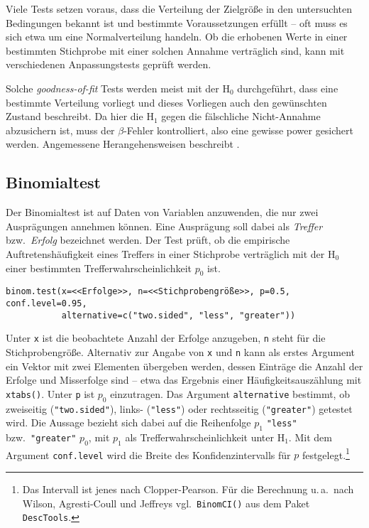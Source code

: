 Viele Tests setzen voraus, dass die Verteilung der Zielgröße in den untersuchten Bedingungen bekannt ist und bestimmte Voraussetzungen erfüllt -- oft muss es sich etwa um eine Normalverteilung handeln. Ob die erhobenen Werte in einer bestimmten Stichprobe mit einer solchen Annahme verträglich sind, kann mit verschiedenen Anpassungstests geprüft werden.

Solche \emph{goodness-of-fit} Tests werden meist mit der $\text{H}_{0}$ durchgeführt, dass eine bestimmte Verteilung vorliegt und dieses Vorliegen auch den gewünschten Zustand beschreibt. Da hier die $\text{H}_{1}$ gegen die fälschliche Nicht-Annahme abzusichern ist, muss der $\beta$-Fehler kontrolliert, also eine gewisse power gesichert werden. Angemessene Herangehensweisen beschreibt .

\subsection{Binomialtest}
\label{sec:binomTest}

Der Binomialtest ist auf Daten von Variablen anzuwenden, die nur zwei Ausprägungen annehmen können. Eine Ausprägung soll dabei als \emph{Treffer} bzw.\ \emph{Erfolg} bezeichnet werden. Der Test prüft, ob die empirische Auftretenshäufigkeit eines Treffers in einer Stichprobe verträglich mit der $\text{H}_{0}$ einer bestimmten Trefferwahrscheinlichkeit $p_{0}$ ist.
\begin{lstlisting}
binom.test(x=<<Erfolge>>, n=<<Stichprobengröße>>, p=0.5, conf.level=0.95,
           alternative=c("two.sided", "less", "greater"))
\end{lstlisting}

Unter \lstinline!x! ist die beobachtete Anzahl der Erfolge anzugeben, \lstinline!n! steht für die Stichprobengröße. Alternativ zur Angabe von \lstinline!x! und \lstinline!n! kann als erstes Argument ein Vektor mit zwei Elementen übergeben werden, dessen Einträge die Anzahl der Erfolge und Misserfolge sind -- etwa das Ergebnis einer Häufigkeitsauszählung mit \lstinline!xtabs()!. Unter \lstinline!p! ist $p_{0}$ einzutragen. Das Argument \lstinline!alternative! bestimmt, ob zweiseitig (\lstinline!"two.sided"!), links- (\lstinline!"less"!) oder rechtsseitig (\lstinline!"greater"!) getestet wird. Die Aussage bezieht sich dabei auf die Reihenfolge $p_{1}$ \lstinline!"less"! bzw.\ \lstinline!"greater"! $p_{0}$, mit $p_{1}$ als Trefferwahrscheinlichkeit unter $\text{H}_{1}$. Mit dem Argument \lstinline!conf.level! wird die Breite des Konfidenzintervalls für $p$ festgelegt.\footnote{Das Intervall ist jenes nach Clopper-Pearson. Für die Berechnung u.\,a.\ nach Wilson, Agresti-Coull und Jeffreys vgl.\ \lstinline!BinomCI()! aus dem Paket \lstinline!DescTools!.}

